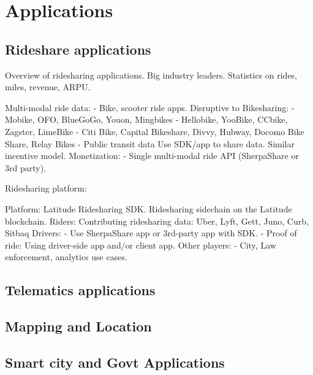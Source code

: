 \section{Applications}
\label{sec:apps}


\subsection{Rideshare applications}

Overview of ridesharing applications. Big industry leaders. Statistics on rides, miles, revenue, ARPU.

Multi-modal ride data:
 - Bike, scooter ride apps.
Disruptive to Bikesharing:
 - Mobike, OFO, BlueGoGo, Youon, Mingbikes
 - Hellobike, YooBike, CCbike, Zagster, LimeBike
 - Citi Bike, Capital Bikeshare, Divvy, Hubway, Docomo Bike
Share, Relay Bikes
 - Public transit data
Use SDK/app to share data. Similar incentive model.
Monetization:
 - Single multi-modal ride API (SherpaShare or 3rd party).

 Ridesharing platform:

 Platform:
Latitude Ridesharing SDK.
Ridesharing sidechain on the Latitude blockchain.
Riders:
Contributing ridesharing data:
Uber, Lyft, Gett, Juno, Curb, Sitbaq
Drivers:
 - Use SherpaShare app or 3rd-party app with SDK.
 - Proof of ride:
Using driver-side app and/or client app.
Other players:
 - City, Law enforcement, analytics use cases.

\subsection{Telematics applications}


\subsection{Mapping and Location}

\subsection{Smart city and Govt Applications}
